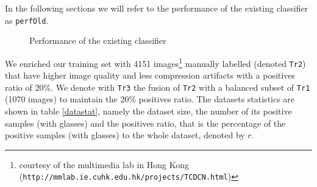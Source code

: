 \documentclass[a4paper]{article}
\begin{document}
    In the following sections we will refer to the performance of the existing classifier as \texttt{perfOld}.
	\begin{figure}[H]
    \centering
    \vspace{5pt}
    \vspace{5pt}
    \caption{Performance of the existing classifier}
	\end{figure}
	We enriched our training set with 4151 images\footnote{courtesy of the multimedia lab in Hong Kong (\texttt{http://mmlab.ie.cuhk.edu.hk/projects/TCDCN.html})} manually labelled (denoted \texttt{Tr2}) that have higher image quality and less compression artifacts with a positives ratio of 20\%. We denote with \texttt{Tr3} the fusion of \texttt{Tr2} with a balanced subset of \texttt{Tr1} (1070 images) to maintain the 20\% positives ratio. The datasets statistics are shown in table \ref{datastat}, namely the dataset size, the number of its positive samples (with glasses) and the positives ratio, that is the percentage of the positive samples (with glasses) to the whole dataset, denoted by $r$.
\end{document}
